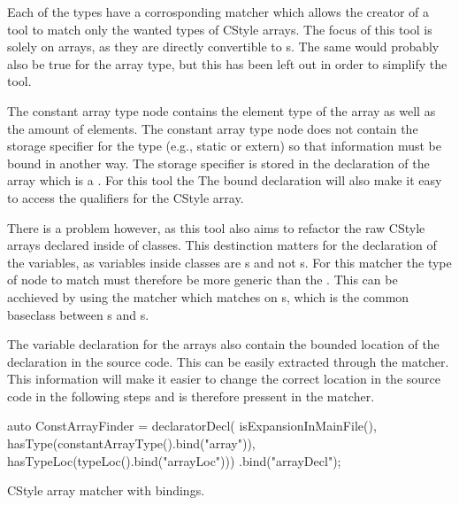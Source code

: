 Each of the types have a corrosponding matcher which allows the creator of a tool to match only the wanted types of CStyle arrays. The focus of this tool is solely on  arrays, as they are directly convertible to s. The same would probably also be true for the  array type, but this has been left out in order to simplify the tool.

The constant array type node contains the element type of the array as well as the amount of elements. The constant array type node does not contain the storage specifier for the type (e.g., static or extern) so that information must be bound in another way. The storage specifier is stored in the declaration of the array which is a . For this tool the  The bound declaration will also make it easy to access the qualifiers for the CStyle array. 

There is a problem however, as this tool also aims to refactor the raw CStyle arrays declared inside of classes. This destinction matters for the declaration of the variables, as variables inside classes are s and not s. For this matcher the type of node to match must therefore be more generic than the . This can be acchieved by using the  matcher which matches on s, which is the common baseclass between s and s.

The variable declaration for the arrays also contain the bounded location of the declaration in the source code. This can be easily extracted through the  matcher. This information will make it easier to change the correct location in the source code in the following steps and is therefore pressent in the matcher.

\begin{listing}[H]
    \begin{cppcode}
auto ConstArrayFinder = 
    declaratorDecl(
        isExpansionInMainFile(),
        hasType(constantArrayType().bind("array")),
        hasTypeLoc(typeLoc().bind("arrayLoc")))
    .bind("arrayDecl");
    \end{cppcode}
    \caption{CStyle array matcher with bindings.}
    \label{code:085tool_ex:CSMatcher}
\end{listing}



